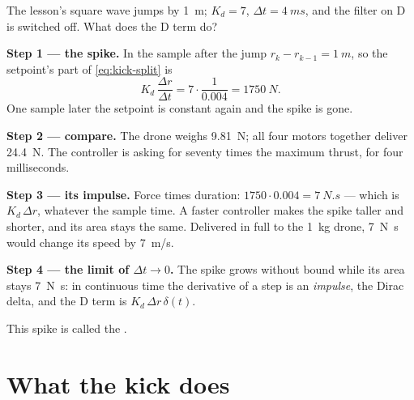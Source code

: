 \begin{example}
\label{ex:kick-size}
The lesson's square wave jumps by \SI{1}{m}; $K_d = 7$, $\Delta t = \SI{4}{ms}$, and the filter on D is switched off. What does the D term do?

\textbf{Step 1 — the spike.} In the sample after the jump $r_k - r_{k-1} = \SI{1}{m}$, so the setpoint's part of \cref{eq:kick-split} is
\begin{equation*}
  K_d\,\frac{\Delta r}{\Delta t} = 7 \cdot \frac{1}{0.004} = \SI{1750}{N}.
\end{equation*}
One sample later the setpoint is constant again and the spike is gone.

\textbf{Step 2 — compare.} The drone weighs \SI{9.81}{N}; all four motors together deliver \SI{24.4}{N}. The controller is asking for seventy times the maximum thrust, for four milliseconds.

\textbf{Step 3 — its impulse.} Force times duration: $1750 \cdot 0.004 = \SI{7}{N.s}$ — which is $K_d\,\Delta r$, whatever the sample time. A faster controller makes the spike taller and shorter, and its area stays the same. Delivered in full to the \SI{1}{kg} drone, \SI{7}{N.s} would change its speed by \SI{7}{m/s}.

\textbf{Step 4 — the limit of $\Delta t \to 0$.} The spike grows without bound while its area stays \SI{7}{N.s}: in continuous time the derivative of a step is an \emph{impulse}, the Dirac delta, and the D term is $K_d\,\Delta r\,\delta(t)$.
\end{example}

This spike is called the .

\section{What the kick does}


